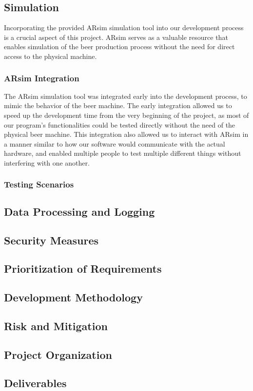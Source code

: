 \subsection{Simulation}
Incorporating the provided ARsim simulation tool into our development process is a crucial aspect of this project. 
ARsim serves as a valuable resource that enables simulation of the beer production process without the need for direct access to the physical machine. 

\subsubsection{ARsim Integration}
The ARsim simulation tool was integrated early into the development process, to mimic the behavior of the beer machine.
The early integration allowed us to speed up the development time from the very beginning of the project, as most of our program's functionalities could be tested directly without the need of the physical beer machine.
This integration also allowed us to interact with ARsim in a manner similar to how our software would communicate with the actual hardware, and enabled multiple people to test multiple different things without interfering with one another. 

\subsubsection{Testing Scenarios}


\subsection{Data Processing and Logging}

\subsection{Security Measures}

\subsection{Prioritization of Requirements}

\subsection*{Development Methodology}

\subsection*{Risk and Mitigation}

\subsection{Project Organization}

\subsection{Deliverables}